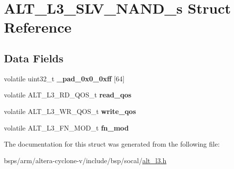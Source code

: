 \hypertarget{structALT__L3__SLV__NAND__s}{}\section{A\+L\+T\+\_\+\+L3\+\_\+\+S\+L\+V\+\_\+\+N\+A\+N\+D\+\_\+s Struct Reference}
\label{structALT__L3__SLV__NAND__s}
\subsection*{Data Fields}
\begin{DoxyCompactItemize}
\item 
\mbox{\label{structALT__L3__SLV__NAND__s_a230de5c50a35b072f1b2c40228849090}} 
volatile uint32\+\_\+t {\bfseries \+\_\+pad\+\_\+0x0\+\_\+0xff} \mbox{[}64\mbox{]}
\item 
\mbox{\label{structALT__L3__SLV__NAND__s_a042304dfb8a2d8babd5dc66afa5363a8}} 
volatile A\+L\+T\+\_\+\+L3\+\_\+\+R\+D\+\_\+\+Q\+O\+S\+\_\+t {\bfseries read\+\_\+qos}
\item 
\mbox{\label{structALT__L3__SLV__NAND__s_abdbf4ec4018e5e7cbc3e82ee994e40f0}} 
volatile A\+L\+T\+\_\+\+L3\+\_\+\+W\+R\+\_\+\+Q\+O\+S\+\_\+t {\bfseries write\+\_\+qos}
\item 
\mbox{\label{structALT__L3__SLV__NAND__s_a21e47462daf6057b0cfb59521491fd0b}} 
volatile A\+L\+T\+\_\+\+L3\+\_\+\+F\+N\+\_\+\+M\+O\+D\+\_\+t {\bfseries fn\+\_\+mod}
\end{DoxyCompactItemize}


The documentation for this struct was generated from the following file\+:\begin{DoxyCompactItemize}
\item 
bsps/arm/altera-\/cyclone-\/v/include/bsp/socal/\mbox{\hyperlink{alt__l3_8h}{alt\+\_\+l3.\+h}}\end{DoxyCompactItemize}
